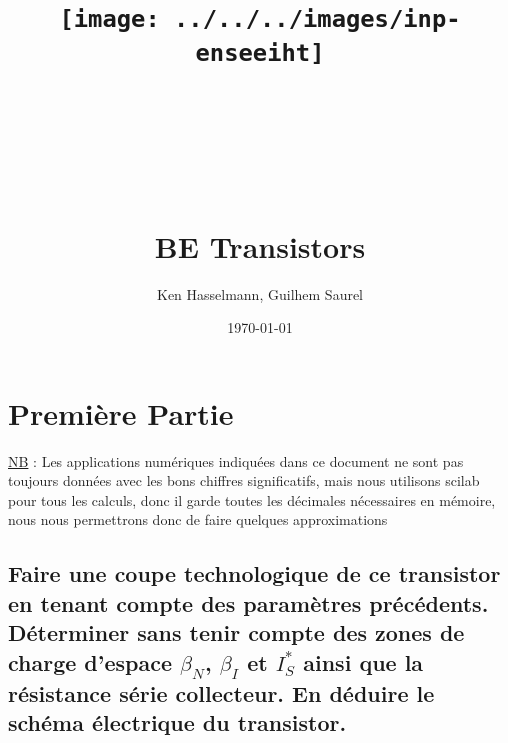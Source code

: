 \documentclass[10pt]{article}
\title{\texttt{[image: ../../../images/inp-enseeiht]} \\ ~ \\ ~ \\ ~ \\ ~ \\ BE Transistors }
\author{Ken Hasselmann, Guilhem Saurel}
\date{\today}
\begin{document}
 \begin{titlepage}
  \maketitle
  \tableofcontents
 \end{titlepage}

 \section{Première Partie}
  \ul{NB} : Les applications numériques indiquées dans ce document ne sont pas toujours données avec les bons chiffres significatifs, mais nous utilisons scilab pour tous les calculs, donc il garde toutes les décimales nécessaires en mémoire, nous nous permettrons donc de faire quelques approximations

  \subsection{Faire une coupe technologique de ce transistor en tenant compte des paramètres précédents. Déterminer sans tenir compte des zones de charge d’espace $\beta_N$, $\beta_I$ et $I_S^\ast$ ainsi que la résistance série collecteur. En déduire le schéma électrique du transistor.}
\end{document}
